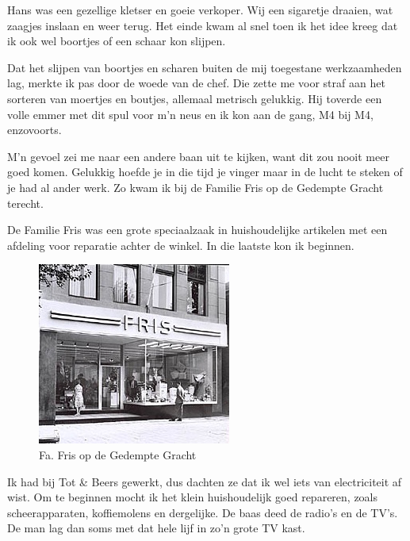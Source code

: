 \documentclass[12pt,twoside, openright]{memoir}
\begin{document}
Hans was een gezellige kletser en goeie verkoper. Wij een sigaretje draaien, wat zaagjes inslaan en weer terug. Het einde kwam al snel toen ik het idee kreeg dat ik ook wel boortjes of een schaar kon slijpen. 

Dat het slijpen van boortjes en scharen buiten de mij toegestane werkzaamheden lag, merkte ik pas door de woede van de chef. Die zette me voor straf aan het sorteren van moertjes en boutjes, allemaal metrisch gelukkig. Hij toverde een volle emmer met dit spul voor m’n neus en ik kon aan de gang, M4 bij M4, enzovoorts. 

M’n gevoel zei me naar een andere baan uit te kijken, want dit zou nooit meer goed komen. Gelukkig hoefde je in die tijd je vinger maar in de lucht te steken of je had al ander werk. Zo kwam ik bij de Familie Fris op de Gedempte Gracht terecht.

De Familie Fris was een grote speciaalzaak in huishoudelijke artikelen met een afdeling voor reparatie achter de winkel. In die laatste kon ik beginnen. 

\begin{figure}
\includegraphics[width=\textwidth]{img/ch32/Fris}
\caption*{\footnotesize Fa. Fris op de Gedempte Gracht}
\end{figure}

Ik had bij Tot \& Beers gewerkt, dus dachten ze dat ik wel iets van electriciteit af wist. Om te beginnen mocht ik het klein huishoudelijk goed repareren, zoals scheerapparaten, koffiemolens en dergelijke. De baas deed de radio’s en de TV’s. De man lag dan soms met dat hele lijf in zo’n grote TV kast. 
\end{document}
